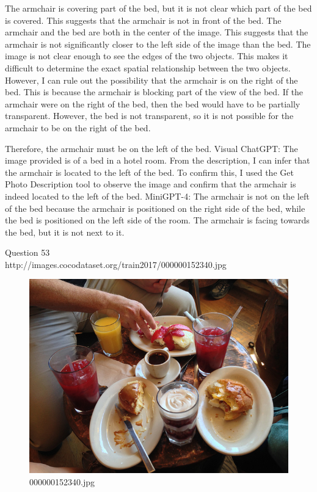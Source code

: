 \begin{enumerate}
    The armchair is covering part of the bed, but it is not clear which part of the bed is covered. This suggests that the armchair is not in front of the bed.
    The armchair and the bed are both in the center of the image. This suggests that the armchair is not significantly closer to the left side of the image than the bed.
    The image is not clear enough to see the edges of the two objects. This makes it difficult to determine the exact spatial relationship between the two objects.
    However, I can rule out the possibility that the armchair is on the right of the bed. This is because the armchair is blocking part of the view of the bed. If the armchair were on the right of the bed, then the bed would have to be partially transparent. However, the bed is not transparent, so it is not possible for the armchair to be on the right of the bed.

    Therefore, the armchair must be on the left of the bed.
    \subitem Visual ChatGPT: The image provided is of a bed in a hotel room. From the description, I can infer that the armchair is located to the left of the bed. To confirm this, I used the Get Photo Description tool to observe the image and confirm that the armchair is indeed located to the left of the bed.
    \subitem MiniGPT-4: The armchair is not on the left of the bed because the armchair is positioned on the right side of the bed, while the bed is positioned on the left side of the room. The armchair is facing towards the bed, but it is not next to it.
\end{enumerate}
Question 53\\
http://images.cocodataset.org/train2017/000000152340.jpg
\begin{figure}[h]
    \centering
    \includegraphics[width=0.8\linewidth]{../image set/hard/000000152340.jpg}
    \caption{000000152340.jpg}
\end{figure}
